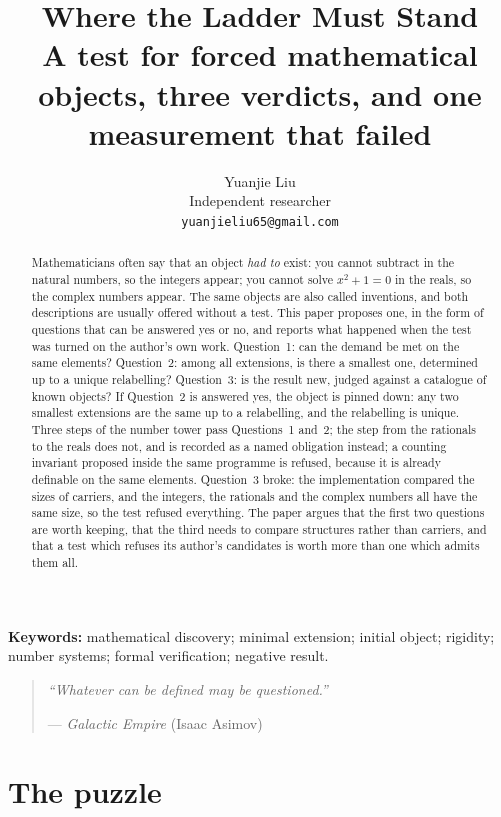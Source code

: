 \documentclass[12pt,a4paper]{article}
\title{Where the Ladder Must Stand\\
\large A test for forced mathematical objects, three verdicts, and one measurement that failed}
\author{Yuanjie Liu\\
\small Independent researcher\\
\small \texttt{yuanjieliu65@gmail.com}}
\date{}
\begin{document}
\maketitle

\begin{abstract}
\noindent
Mathematicians often say that an object \emph{had to} exist: you cannot subtract
in the natural numbers, so the integers appear; you cannot solve $x^{2}+1=0$ in
the reals, so the complex numbers appear.  The same objects are also called
inventions, and both descriptions are usually offered without a test.  This paper
proposes one, in the form of questions that can be answered yes or no, and reports
what happened when the test was turned on the author's own work.  Question~1: can
the demand be met on the same elements?  Question~2: among all extensions, is
there a smallest one, determined up to a unique relabelling?  Question~3: is the
result new, judged against a catalogue of known objects?  If Question~2 is
answered yes, the object is pinned down: any two smallest extensions are the same
up to a relabelling, and the relabelling is unique.  Three steps of the number
tower pass Questions~1 and~2; the step from the rationals to the reals does not,
and is recorded as a named obligation instead; a counting invariant proposed
inside the same programme is refused, because it is already definable on the same
elements.  Question~3 broke: the implementation compared the sizes of carriers,
and the integers, the rationals and the complex numbers all have the same size,
so the test refused everything.  The paper argues that the first two questions
are worth keeping, that the third needs to compare structures rather than
carriers, and that a test which refuses its author's candidates is worth more
than one which admits them all.
\end{abstract}

\noindent\textbf{Keywords:} mathematical discovery; minimal extension; initial
object; rigidity; number systems; formal verification; negative result.

\begin{quote}
\itshape
``Whatever can be defined may be questioned.''
\par
\vspace{0.4em}
--- \emph{Galactic Empire} (Isaac Asimov)
\end{quote}

\section{The puzzle}
\end{document}
